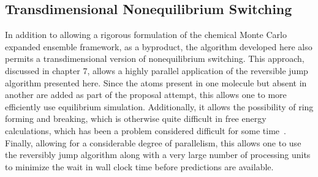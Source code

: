 \subsection{Transdimensional Nonequilibrium Switching}
%
In addition to allowing a rigorous formulation of the chemical Monte Carlo expanded ensemble framework, as a byproduct, the algorithm developed here also permits a transdimensional version of nonequilibrium switching.
%
This approach, discussed in chapter 7, allows a highly parallel application of the reversible jump algorithm presented here.
%
Since the atoms present in one molecule but absent in another are added as part of the proposal attempt, this allows one to more efficiently use equilibrium simulation.
%
Additionally, it allows the possibility of ring forming and breaking, which is otherwise quite difficult in free energy calculations, which has been a problem considered difficult for some time~\cite{Liu2015}.
%
Finally, allowing for a considerable degree of parallelism, this allows one to use the reversibly jump algorithm along with a very large number of processing units to minimize the wait in wall clock time before predictions are available.